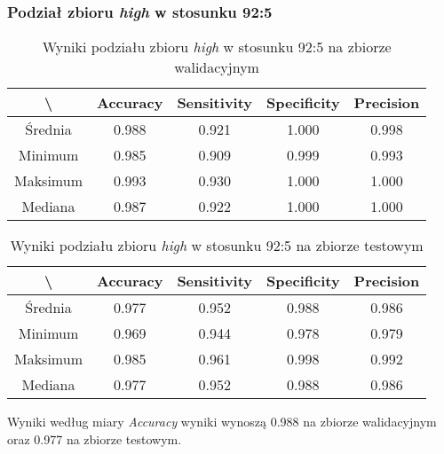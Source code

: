 \subsubsection{Podział zbioru \textit{high} w stosunku 92:5}


\begin{table}[H]
	\centering
	\caption{Wyniki podziału zbioru \textit{high} w stosunku 92:5 na zbiorze walidacyjnym}
	\vspace{6pt}
	{\footnotesize
		\begin{tabular}{|c|c|c|c|c|}
      \hline \textbackslash & Accuracy & Sensitivity & Specificity & Precision \\
      \hline Średnia & 0.988 & 0.921 & 1.000 & 0.998 \\
      \hline Minimum & 0.985 & 0.909 & 0.999 & 0.993 \\
      \hline Maksimum & 0.993 & 0.930 & 1.000 & 1.000 \\
      \hline Mediana & 0.987 & 0.922 & 1.000 & 1.000 \\
      \hline
    \end{tabular}
    \label{Tab:highsplita_val}
	}
	\vspace{0pt}
\end{table}

\begin{table}[H]
	\centering
	\caption{Wyniki podziału zbioru \textit{high} w stosunku 92:5 na zbiorze testowym}
	\vspace{6pt}
	{\footnotesize
		\begin{tabular}{|c|c|c|c|c|}
      \hline \textbackslash & Accuracy & Sensitivity & Specificity & Precision \\
      \hline Średnia & 0.977 & 0.952 & 0.988 & 0.986 \\
      \hline Minimum & 0.969 & 0.944 & 0.978 & 0.979 \\
      \hline Maksimum & 0.985 & 0.961 & 0.998 & 0.992 \\
      \hline Mediana & 0.977 & 0.952 & 0.988 & 0.986 \\
      \hline
    \end{tabular}
    \label{Tab:highsplita_test}
	}
	\vspace{0pt}
\end{table}

Wyniki według miary \textit{Accuracy} wyniki wynoszą 0.988 na zbiorze walidacyjnym oraz 0.977 na zbiorze testowym.
